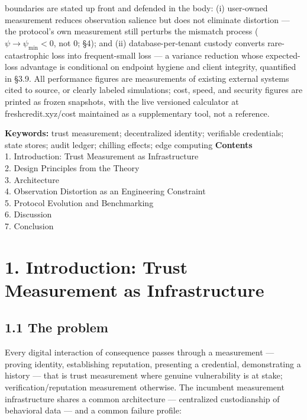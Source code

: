 \documentclass[
]{article}
\begin{document}
boundaries are stated up front and defended in the body: (i) user-owned
measurement reduces observation salience but does not eliminate
distortion --- the protocol's own measurement still perturbs the
mismatch process (\(\psi \to \psi_{\min} < 0\), not 0; §4); and (ii)
database-per-tenant custody converts rare-catastrophic loss into
frequent-small loss --- a variance reduction whose expected-loss
advantage is conditional on endpoint hygiene and client integrity,
quantified in §3.9. All performance figures are measurements of existing
external systems cited to source, or clearly labeled simulations; cost,
speed, and security figures are printed as frozen snapshots, with the
live versioned calculator at freshcredit.xyz/cost maintained as a
supplementary tool, not a reference.

\textbf{Keywords:} trust measurement; decentralized identity; verifiable
credentials; state stores; audit ledger; chilling effects; edge
computing \textbf{Contents}\\
1. Introduction: Trust Measurement as Infrastructure\\
2. Design Principles from the Theory\\
3. Architecture\\
4. Observation Distortion as an Engineering Constraint\\
5. Protocol Evolution and Benchmarking\\
6. Discussion\\
7. Conclusion\\

\section{1. Introduction: Trust Measurement as
Infrastructure}\label{introduction-trust-measurement-as-infrastructure}

\subsection{1.1 The problem}\label{the-problem}

Every digital interaction of consequence passes through a measurement
--- proving identity, establishing reputation, presenting a credential,
demonstrating a history --- that is trust measurement where genuine
vulnerability is at stake; verification/reputation measurement
otherwise. The incumbent measurement infrastructure shares a common
architecture --- centralized custodianship of behavioral data --- and a
common failure profile:
\end{document}
